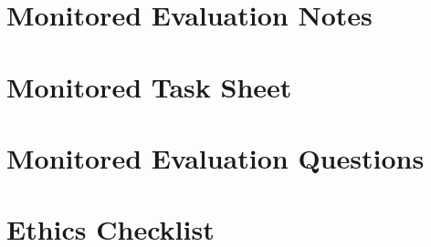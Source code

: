 \documentclass{l4proj}
\begin{document}
\begin{appendices}
% 
% 
% 
% 
% 


% 
\section{Monitored Evaluation Notes}
\label{section:monitored-eval-notes}

\section{Monitored Task Sheet}
\label{section:monitored-tasks}

\section{Monitored Evaluation Questions}
\label{section:mon-questions}

% 
\section{Ethics Checklist}

\end{appendices}






\end{document}
